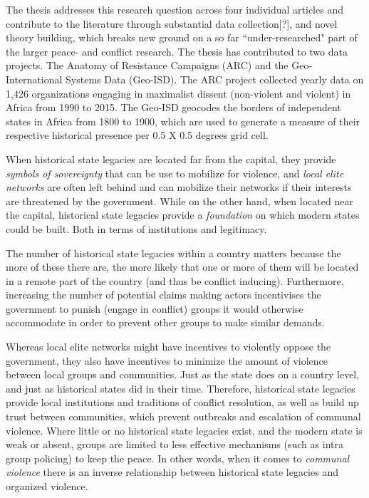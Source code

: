 \documentclass[12pt]{article}
\begin{document}
The thesis addresses this research question across four individual articles and
contribute to the literature through substantial data collection[?], and novel
theory building, which breaks new ground on a so far ``under-researched" part of
the larger peace- and conflict research. The thesis has contributed to two data
projects. The Anatomy of Resistance Campaigns (ARC) and the Geo-International
Systems Data (Geo-ISD). The ARC project collected yearly data on 1,426 organizations
engaging in maximalist dissent (non-violent and violent) in Africa from 1990 to
2015. The Geo-ISD geocodes the borders of independent states in Africa from
1800 to 1900, which are used to generate a measure of their respective
historical presence per 0.5 X 0.5 degrees grid cell. 

When historical state legacies are located far from the capital, they provide
\textit{symbols of sovereignty} that can be use to mobilize for violence, and
\textit{local elite networks} are often left behind and can mobilize their
networks if their interests are threatened by the government. While on the other
hand, when located near the capital, historical state legacies provide a
\textit{foundation} on which modern states could be built. Both in terms of
institutions and legitimacy.

The number of historical state legacies within a country matters because the
more of these there are, the more likely that one or more of them will be
located in a remote part of the country (and thus be conflict inducing).
Furthermore, increasing the number of potential claims making actors
incentivises the government to punish (engage in conflict) groups it would
otherwise accommodate in order to prevent other groups to make similar demands.

Whereas local elite networks might have incentives to violently oppose the
government, they also have incentives to minimize the amount of violence
between local groups and communities. Just as the state does on a country
level, and just as historical states did in their time. Therefore, historical
state legacies provide local institutions and traditions of conflict
resolution, as well as build up trust between communities, which prevent
outbreaks and escalation of communal violence. Where little or no historical
state legacies exist, and the modern state is weak or absent, groups are limited
to less effective mechanisms (such as intra group policing) to keep the peace.
In other words, when it comes to \textit{communal violence} there is an inverse
relationship between historical state legacies and organized violence.
\end{document}

